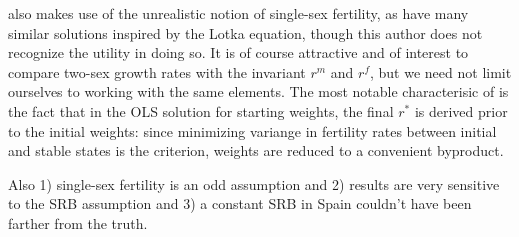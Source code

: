 \citet{mitra1978derivation} also makes use of the unrealistic
notion of single-sex fertility, as have many similar solutions inspired by the
Lotka equation, though this author does not recognize the utility in doing so.
It is of course attractive and of interest to compare two-sex growth rates with the invariant $r^m$ and $r^f$, but
we need not limit ourselves to working with the same elements. The most notable characterisic of
\citep{mitra1978derivation} is the fact that in the OLS solution for starting
weights, the final $r^\ast$ is derived prior to the initial weights: since
minimizing variange in fertility rates between initial and stable states is the
criterion, weights are reduced to a convenient byproduct.

Also 1) single-sex fertility is an odd assumption and 2) results are very
sensitive to the SRB assumption and 3) a constant SRB in Spain couldn't have
been farther from the truth.





